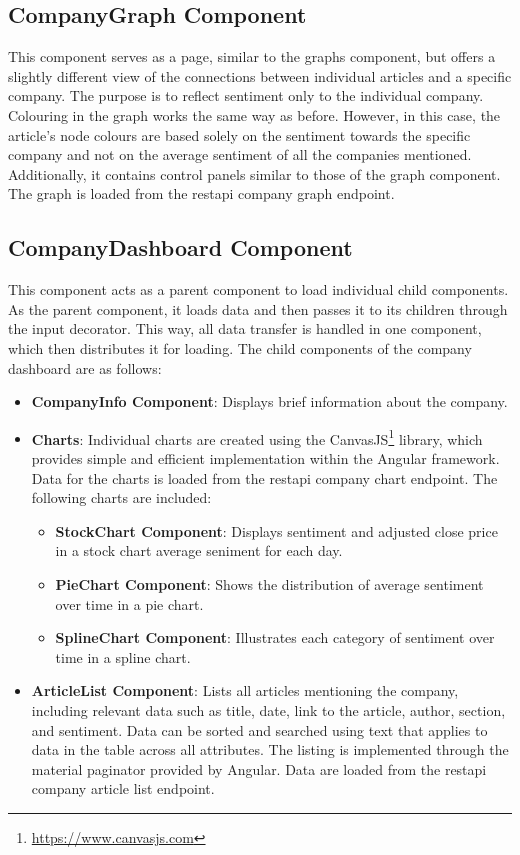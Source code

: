 \subsection{CompanyGraph Component}
\label{subsec:frontend-graph}
This component serves as a page, similar to the graphs component, but offers a slightly different view of the connections between individual articles and a specific company. The purpose is to reflect sentiment only to the individual company. Colouring in the graph works the same way as before. However, in this case, the article's node colours are based solely on the sentiment towards the specific company and not on the average sentiment of all the companies mentioned. Additionally, it contains control panels similar to those of the graph component. The graph is loaded from the \acrshort{restapi} company graph endpoint.

\subsection{CompanyDashboard Component}
\label{subsec:frontend-dashboard}
This component acts as a parent component to load individual child components. As the parent component, it loads data and then passes it to its children through the input decorator. This way, all data transfer is handled in one component, which then distributes it for loading. The child components of the company dashboard are as follows:

\begin{itemize}
    \item \textbf{CompanyInfo Component}: Displays brief information about the company.
    \item \textbf{Charts}: Individual charts are created using the CanvasJS\footnote{\href{https://www.canvasjs.com}{https://www.canvasjs.com}} library, which provides simple and efficient implementation within the Angular framework. Data for the charts is loaded from the \acrshort{restapi} company chart endpoint. The following charts are included:
    \begin{itemize}
        \item \textbf{StockChart Component}: Displays sentiment and adjusted close price in a stock chart average seniment for each day.
        \item \textbf{PieChart Component}: Shows the distribution of average sentiment over time in a pie chart.
        \item \textbf{SplineChart Component}: Illustrates each category of sentiment over time in a spline chart. 
    \end{itemize}
    \item \textbf{ArticleList Component}: Lists all articles mentioning the company, including relevant data such as title, date, link to the article, author, section, and sentiment. Data can be sorted and searched using text that applies to data in the table across all attributes. The listing is implemented through the material paginator provided by Angular. Data are loaded from the \acrshort{restapi} company article list endpoint.
\end{itemize}


